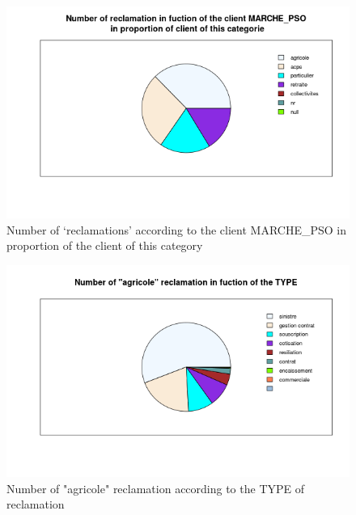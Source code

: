 \documentclass[a4paper, 11pt]{article}
\begin{document}
    \begin{figure}[!ht]
    	\centering
            \includegraphics[height = 10 cm]{Valentin/Number_of_reclamation_in_fuction_of_the_client_MARCHE_PSO_proportion.png}
            \caption{Number of `reclamations' according to the client MARCHE\_PSO in proportion of the client of this category}
            \label{fig:reclamtion_pso3}
    \end{figure}
    
    \begin{figure}[!ht]
    	\centering
            \includegraphics[height = 10 cm]{Valentin/Number_of_agricole_reclamation_in_fuction_of_the_TYPE.png}
            \caption{Number of "agricole" reclamation according to the TYPE of reclamation}
            \label{fig:reclamtion_agri}
    \end{figure}
    
\end{document}
